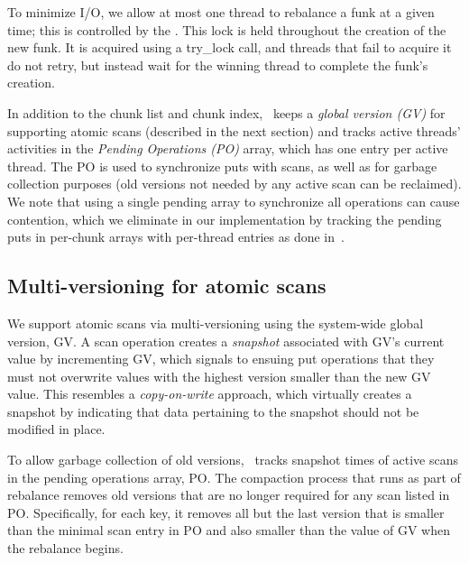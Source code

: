 To minimize I/O, we allow at most one thread to rebalance a funk at a given time; this is controlled by 
the  . 
This lock is held throughout the creation of the new funk. 
It is acquired using a try\_lock call, and threads that fail to acquire it do not retry, but instead wait for the winning thread to complete the funk's creation.

In addition to the chunk list and chunk index, \sys\ keeps a \emph{global version (GV)} for supporting atomic scans (described in the next section) and tracks active threads' activities in the 
\emph{Pending Operations (PO)} array, which has one entry per active thread. 
The PO is used to synchronize puts with scans, as well as for  garbage collection purposes (old 
versions not needed by any active scan can be reclaimed).
We note that using a single pending array to synchronize all operations can cause contention, which we
eliminate in our implementation by tracking the pending puts in per-chunk arrays with per-thread entries as done in~\cite{kiwi}.

\subsection{Multi-versioning for atomic scans}
\label{ssec:scans}


We support atomic scans via multi-versioning using the system-wide global version, GV. 
A scan operation creates a \emph{snapshot} associated with GV's current value by incrementing GV, 
which signals to ensuing put operations that they must not overwrite values  with the highest
version smaller than the new GV value.
This resembles a \emph{copy-on-write} approach, which virtually creates a snapshot by 
indicating that data pertaining to the snapshot should not be modified in place.  

To allow garbage collection of old versions, \sys\  tracks snapshot times of 
active scans in the pending operations array, PO.
The compaction process that runs as part of rebalance removes old versions that are no longer required for any  
scan listed in PO. Specifically, for each key, it removes all but the last version that is smaller than the minimal
scan entry in PO and also smaller than the value of GV when the rebalance begins. 

